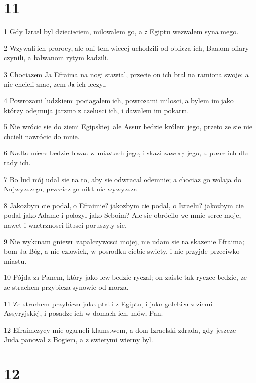 \chapter{11}

\par 1 Gdy Izrael byl dziecieciem, milowalem go, a z Egiptu wezwalem syna mego.
\par 2 Wzywali ich prorocy, ale oni tem wiecej uchodzili od oblicza ich, Baalom ofiary czynili, a balwanom rytym kadzili.
\par 3 Chociazem Ja Efraima na nogi stawial, przecie on ich bral na ramiona swoje; a nie chcieli znac, zem Ja ich leczyl.
\par 4 Powrozami ludzkiemi pociagalem ich, powrozami milosci, a bylem im jako którzy odejmuja jarzmo z czelusci ich, i dawalem im pokarm.
\par 5 Nie wrócic sie do ziemi Egipskiej: ale Assur bedzie królem jego, przeto ze sie nie chcieli nawrócic do mnie.
\par 6 Nadto miecz bedzie trwac w miastach jego, i skazi zawory jego, a pozre ich dla rady ich.
\par 7 Bo lud mój udal sie na to, aby sie odwracal odemnie; a chociaz go wolaja do Najwyzszego, przeciez go nikt nie wywyzsza.
\par 8 Jakozbym cie podal, o Efraimie? jakozbym cie podal, o Izraelu? jakozbym cie podal jako Adame i polozyl jako Seboim? Ale sie obrócilo we mnie serce moje, nawet i wnetrznosci litosci poruszyly sie.
\par 9 Nie wykonam gniewu zapalczywosci mojej, nie udam sie na skazenie Efraima; bom Ja Bóg, a nie czlowiek, w posrodku ciebie swiety, i nie przyjde przeciwko miastu.
\par 10 Pójda za Panem, który jako lew bedzie ryczal; on zaiste tak ryczec bedzie, ze ze strachem przybieza synowie od morza.
\par 11 Ze strachem przybieza jako ptaki z Egiptu, i jako golebica z ziemi Assyryjskiej, i posadze ich w domach ich, mówi Pan.
\par 12 Efraimczycy mie ogarneli klamstwem, a dom Izraelski zdrada, gdy jeszcze Juda panowal z Bogiem, a z swietymi wierny byl.

\chapter{12}

